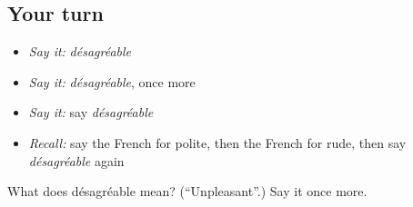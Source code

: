 \subsection*{Your turn}
\begin{itemize}
\raggedright
  \item \emph{Say it:} \emph{désagréable}
  \item \emph{Say it:} \emph{désagréable}, once more
  \item \emph{Say it:} say \emph{désagréable}
  \item \emph{Recall:} say the French for polite, then the French for rude, then say \emph{désagréable} again
\end{itemize}

\begin{tcolorbox}[breakable,colback=teal!4,colframe=teal!35!black,title={Before you move on}]
What does désagréable mean? (\textquotedblleft{}Unpleasant\textquotedblright{}.) Say it once more.
\end{tcolorbox}
